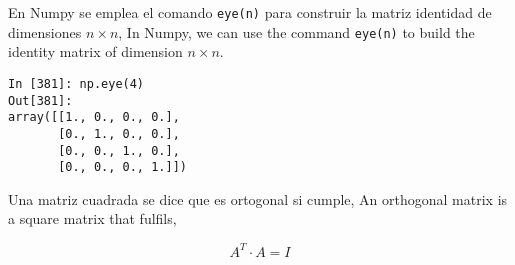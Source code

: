 \begin{paracol}{2}
En Numpy se emplea el comando \texttt{eye(n)} para construir la matriz identidad de dimensiones $n\times n$,
\switchcolumn
In Numpy, we can use the command \texttt{eye(n)} to build the identity matrix of dimension $n\times n$.   
\end{paracol}

\begin{center}
    \begin{minipage}{0.3\textwidth}
        \begin{verbatim}
In [381]: np.eye(4)
Out[381]: 
array([[1., 0., 0., 0.],
       [0., 1., 0., 0.],
       [0., 0., 1., 0.],
       [0., 0., 0., 1.]])
        \end{verbatim}
    \end{minipage}
\end{center}
\begin{paracol}{2}
Una matriz cuadrada se dice que es ortogonal si cumple,
\switchcolumn
An orthogonal matrix is a square matrix that fulfils,   
\end{paracol}
\begin{equation*}
A^T\cdot A=I
\end{equation*}

